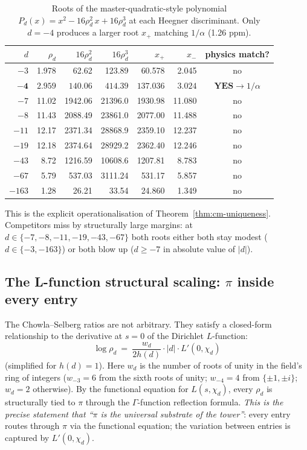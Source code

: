 \documentclass[11pt,reqno]{amsart}
\theoremstyle{plain}
\theoremstyle{definition}
\theoremstyle{remark}
\numberwithin{equation}{section}
\begin{document}
\begin{table}[h]
\centering
\begin{tabular}{r r r r r r c}
\toprule
$d$ & $\rho_{d}$ & $16\rho_{d}^{2}$ & $16\rho_{d}^{3}$ & $x_{+}$ & $x_{-}$ & physics match? \\
\midrule
$-3$   & 1.978  & 62.62  & 123.89  & 60.578 & 2.045  & no \\
$\mathbf{-4}$   & $\mathbf{2.959}$  & $\mathbf{140.06}$ & $\mathbf{414.39}$ & $\mathbf{137.036}$ & $\mathbf{3.024}$ & $\mathbf{YES} \to 1/\alpha$ \\
$-7$   & 11.02  & 1942.06 & 21396.0 & 1930.98 & 11.080 & no \\
$-8$   & 11.43  & 2088.49 & 23861.0 & 2077.00 & 11.488 & no \\
$-11$  & 12.17  & 2371.34 & 28868.9 & 2359.10 & 12.237 & no \\
$-19$  & 12.18  & 2374.64 & 28929.2 & 2362.40 & 12.246 & no \\
$-43$  & 8.72   & 1216.59 & 10608.6 & 1207.81 & 8.783  & no \\
$-67$  & 5.79   & 537.03  & 3111.24 & 531.17  & 5.857  & no \\
$-163$ & 1.28   & 26.21   & 33.54   & 24.860  & 1.349  & no \\
\bottomrule
\end{tabular}
\caption{Roots of the master-quadratic-style polynomial
$P_{d}(x) = x^{2} - 16\rho_{d}^{2}\,x + 16\rho_{d}^{3}$ at each
Heegner discriminant. Only $d = -4$ produces a larger root $x_{+}$
matching $1/\alpha$ (1.26 ppm).}
\label{tab:polys}
\end{table}

This is the explicit operationalisation of Theorem~\ref{thm:cm-uniqueness}.
Competitors miss by structurally large margins: at $d \in \{-7, -8,
-11, -19, -43, -67\}$ both roots either both stay modest
($d \in \{-3, -163\}$) or both blow up ($d \geq -7$ in absolute value
of $|d|$).

\subsection{The L-function structural scaling: $\pi$ inside every entry}

The Chowla--Selberg ratios are not arbitrary. They satisfy a
closed-form relationship to the derivative at $s = 0$ of the
Dirichlet $L$-function:
\[
  \log \rho_{d}\ =\ \frac{w_{d}}{2 h(d)}\cdot |d|\cdot L'(0, \chi_{d})
\]
(simplified for $h(d) = 1$). Here $w_{d}$ is the number of roots
of unity in the field's ring of integers ($w_{-3} = 6$ from the
sixth roots of unity; $w_{-4} = 4$ from $\{\pm 1, \pm i\}$;
$w_{d} = 2$ otherwise). By the functional equation for
$L(s, \chi_{d})$, every $\rho_{d}$ is structurally tied to $\pi$
through the $\Gamma$-function reflection formula. \emph{This is
the precise statement that ``$\pi$ is the universal substrate of
the tower''}: every entry routes through $\pi$ via the functional
equation; the variation between entries is captured by
$L'(0, \chi_{d})$.
\end{document}
